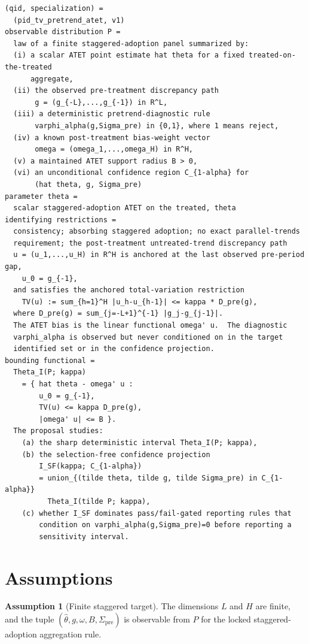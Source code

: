 \documentclass[11pt]{article}
\theoremstyle{definition}
\newtheorem{assumption}{Assumption}
\theoremstyle{plain}
\theoremstyle{remark}
\begin{document}
\begin{verbatim}
(qid, specialization) =
  (pid_tv_pretrend_atet, v1)
observable distribution P =
  law of a finite staggered-adoption panel summarized by:
  (i) a scalar ATET point estimate hat theta for a fixed treated-on-the-treated
      aggregate,
  (ii) the observed pre-treatment discrepancy path
       g = (g_{-L},...,g_{-1}) in R^L,
  (iii) a deterministic pretrend-diagnostic rule
       varphi_alpha(g,Sigma_pre) in {0,1}, where 1 means reject,
  (iv) a known post-treatment bias-weight vector
       omega = (omega_1,...,omega_H) in R^H,
  (v) a maintained ATET support radius B > 0,
  (vi) an unconditional confidence region C_{1-alpha} for
       (hat theta, g, Sigma_pre)
parameter theta =
  scalar staggered-adoption ATET on the treated, theta
identifying restrictions =
  consistency; absorbing staggered adoption; no exact parallel-trends
  requirement; the post-treatment untreated-trend discrepancy path
  u = (u_1,...,u_H) in R^H is anchored at the last observed pre-period gap,
    u_0 = g_{-1},
  and satisfies the anchored total-variation restriction
    TV(u) := sum_{h=1}^H |u_h-u_{h-1}| <= kappa * D_pre(g),
  where D_pre(g) = sum_{j=-L+1}^{-1} |g_j-g_{j-1}|.
  The ATET bias is the linear functional omega' u.  The diagnostic
  varphi_alpha is observed but never conditioned on in the target
  identified set or in the confidence projection.
bounding functional =
  Theta_I(P; kappa)
    = { hat theta - omega' u :
        u_0 = g_{-1},
        TV(u) <= kappa D_pre(g),
        |omega' u| <= B }.
  The proposal studies:
    (a) the sharp deterministic interval Theta_I(P; kappa),
    (b) the selection-free confidence projection
        I_SF(kappa; C_{1-alpha})
        = union_{(tilde theta, tilde g, tilde Sigma_pre) in C_{1-alpha}}
          Theta_I(tilde P; kappa),
    (c) whether I_SF dominates pass/fail-gated reporting rules that
        condition on varphi_alpha(g,Sigma_pre)=0 before reporting a
        sensitivity interval.
\end{verbatim}

\section{Assumptions}
\begin{assumption}[Finite staggered target]\label{ass:finite}
The dimensions \(L\) and \(H\) are finite, and the tuple \((\hat\theta,g,\omega,B,\Sigma_{\mathrm{pre}})\) is observable from \(P\) for the locked staggered-adoption aggregation rule.
\end{assumption}
\end{document}
